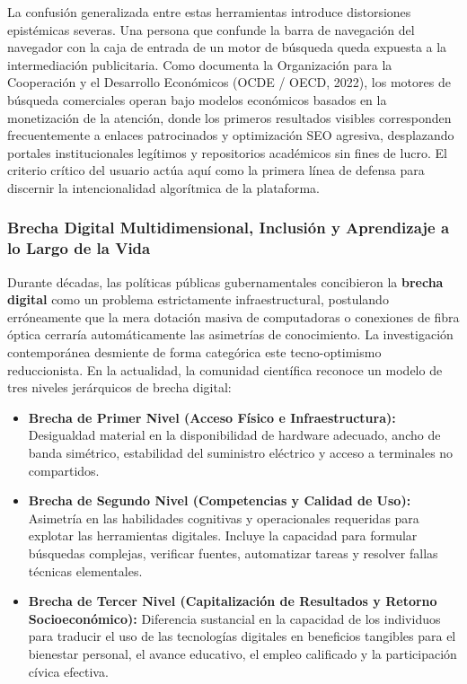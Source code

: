 La confusión generalizada entre estas herramientas introduce distorsiones epistémicas severas. Una persona que confunde la barra de navegación del navegador con la caja de entrada de un motor de búsqueda queda expuesta a la intermediación publicitaria. Como documenta la Organización para la Cooperación y el Desarrollo Económicos (OCDE / OECD, 2022), los motores de búsqueda comerciales operan bajo modelos económicos basados en la monetización de la atención, donde los primeros resultados visibles corresponden frecuentemente a enlaces patrocinados y optimización SEO agresiva, desplazando portales institucionales legítimos y repositorios académicos sin fines de lucro. El criterio crítico del usuario actúa aquí como la primera línea de defensa para discernir la intencionalidad algorítmica de la plataforma.

\subsubsection{Brecha Digital Multidimensional, Inclusión y Aprendizaje a lo Largo de la Vida}

Durante décadas, las políticas públicas gubernamentales concibieron la \textbf{brecha digital} como un problema estrictamente infraestructural, postulando erróneamente que la mera dotación masiva de computadoras o conexiones de fibra óptica cerraría automáticamente las asimetrías de conocimiento. La investigación contemporánea desmiente de forma categórica este tecno-optimismo reduccionista. En la actualidad, la comunidad científica reconoce un modelo de tres niveles jerárquicos de brecha digital:
\begin{itemize}
    \item \textbf{Brecha de Primer Nivel (Acceso Físico e Infraestructura):} Desigualdad material en la disponibilidad de hardware adecuado, ancho de banda simétrico, estabilidad del suministro eléctrico y acceso a terminales no compartidos.
    \item \textbf{Brecha de Segundo Nivel (Competencias y Calidad de Uso):} Asimetría en las habilidades cognitivas y operacionales requeridas para explotar las herramientas digitales. Incluye la capacidad para formular búsquedas complejas, verificar fuentes, automatizar tareas y resolver fallas técnicas elementales.
    \item \textbf{Brecha de Tercer Nivel (Capitalización de Resultados y Retorno Socioeconómico):} Diferencia sustancial en la capacidad de los individuos para traducir el uso de las tecnologías digitales en beneficios tangibles para el bienestar personal, el avance educativo, el empleo calificado y la participación cívica efectiva.
\end{itemize}

